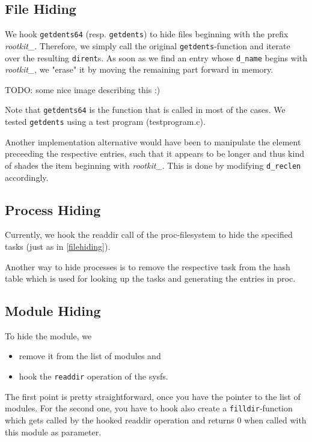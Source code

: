 \documentclass[10pt, letterpaper]{article}
\begin{document}
\subsection{File Hiding}
\label{filehiding}
We hook \texttt{getdents64} (resp. \texttt{getdents}) to hide files beginning with the prefix \textit{rootkit\_}. 
Therefore, we simply call the original \texttt{getdents}-function and iterate over the resulting
\texttt{dirent}s. As soon as we find an entry whose \texttt{d\_name} begins with \textit{rootkit\_},
we "erase" it by moving the remaining part forward in memory. 

TODO: some nice image describing this :)

Note that \texttt{getdents64} is the function that is called in most of the cases.
We tested \texttt{getdents} using a test program (testprogram.c).

Another implementation alternative would have been to manipulate the element preceeding the respective entries, such that it 
appears to be longer and thus kind of shades the item beginning with \textit{rootkit\_}.
This is done by modifying \texttt{d\_reclen} accordingly.

\subsection{Process Hiding}
Currently, we hook the readdir call of the proc-filesystem to hide the specified
tasks (just as in \autoref{filehiding}).

Another way to hide processes is to remove the respective task from the hash table 
which is used for looking up the tasks and generating the entries in proc.

\subsection{Module Hiding}
To hide the module, we 
\begin{itemize}
 \item remove it from the list of modules and
 \item hook the \texttt{readdir} operation of the sysfs.
\end{itemize}

The first point is pretty straightforward, once you have the pointer to the list of modules.
For the second one, you have to hook also create a \texttt{filldir}-function which gets called by the hooked readdir operation and returns 0 when called with this module as parameter.
\end{document}
